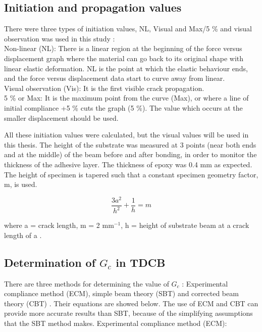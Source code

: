 \documentclass[numbers=noendperiod,chapterprefix=on]{icldt} %
\begin{document}
\subsection{Initiation and propagation values} \label{Initiation and propagation values}
There were three types of initiation values, NL, Visual and Max/5 \% and visual observation was used in this study \cite{Chong2015}:
\\
Non-linear (NL): There is a linear region at the beginning of the force versus displacement graph where the  material can go back to its original shape with linear elastic deformation. NL is the point at which the elastic behaviour ends, and the force versus displacement data start to curve away from linear.
\\
Visual observation (Vis): It is the first visible crack propagation.
\\
5 \% or Max: It is the maximum point from the curve (Max), or where a line of initial compliance +5 \% cuts the graph (5 \%). The value which occurs at the smaller displacement should be used. 

All these initiation values were calculated, but the visual values will be used in this thesis.
The height of the substrate was measured at 3 points (near both ends and at the middle) of the beam before and after bonding, in order to monitor the thickness of the adhesive layer. The thickness of epoxy was 0.4 mm as expected. The height of specimen is tapered such that a constant specimen geometry factor, m, is used.

\begin{equation} 
\frac{3a^2}{h^2}+\frac{1}{h}=m
\end{equation}

where a = crack length, m = 2 mm$ ^{-1} $, h = height of substrate beam at a crack length of a \cite{Chong2015}.

\subsection{Determination of $G_c$ in TDCB}
There are three methods for determining the value of $G_c$ : Experimental compliance method (ECM), simple beam theory (SBT) and corrected beam theory (CBT) \cite{Feito2012}. Their equations are showed below. The use of ECM and CBT can provide more accurate results \cite{Kinloch1990} than SBT, because of the simplifying assumptions that the SBT method makes.
\newline
Experimental compliance method (ECM):
\end{document}
